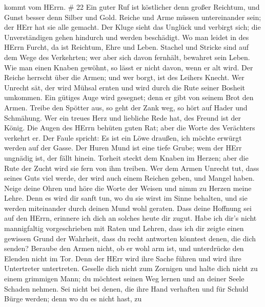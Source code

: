 kommt vom HErrn. \# 22  Ein guter Ruf ist köstlicher denn
großer Reichtum, und Gunst besser denn Silber und Gold. 
Reiche und Arme müssen untereinander sein; der HErr hat sie alle
gemacht.  Der Kluge sieht das Unglück und verbirgt sich; die
Unverständigen gehen hindurch und werden beschädigt.  Wo man
leidet in des HErrn Furcht, da ist Reichtum, Ehre und Leben.
 Stachel und Stricke sind auf dem Wege des Verkehrten; wer
aber sich davon fernhält, bewahret sein Leben.  Wie man
einen Knaben gewöhnt, so lässt er nicht davon, wenn er alt wird.
 Der Reiche herrscht über die Armen; und wer borgt, ist des
Leihers Knecht.  Wer Unrecht sät, der wird Mühsal ernten und
wird durch die Rute seiner Bosheit umkommen.  Ein gütiges
Auge wird gesegnet; denn er gibt von seinem Brot den Armen.
 Treibe den Spötter aus, so geht der Zank weg, so hört auf
Hader und Schmähung.  Wer ein treues Herz und liebliche
Rede hat, des Freund ist der König.  Die Augen des HErrn
behüten guten Rat; aber die Worte des Verächters verkehrt er.
 Der Faule spricht: Es ist ein Löwe draußen, ich möchte
erwürgt werden auf der Gasse.  Der Huren Mund ist eine
tiefe Grube; wem der HErr ungnädig ist, der fällt hinein. 
Torheit steckt dem Knaben im Herzen; aber die Rute der Zucht wird sie
fern von ihm treiben.  Wer dem Armen Unrecht tut, dass
seines Guts viel werde, der wird auch einem Reichen geben, und Mangel
haben.  Neige deine Ohren und höre die Worte der Weisen und
nimm zu Herzen meine Lehre.  Denn es wird dir sanft tun, wo
du sie wirst im Sinne behalten, und sie werden miteinander durch deinen
Mund wohl geraten.  Dass deine Hoffnung sei auf den HErrn,
erinnere ich dich an solches heute dir zugut.  Habe ich
dir's nicht mannigfaltig vorgeschrieben mit Raten und Lehren,
 dass ich dir zeigte einen gewissen Grund der Wahrheit,
dass du recht antworten könntest denen, die dich senden? 
Beraube den Armen nicht, ob er wohl arm ist, und unterdrücke den Elenden
nicht im Tor.  Denn der HErr wird ihre Sache führen und
wird ihre Untertreter untertreten.  Geselle dich nicht zum
Zornigen und halte dich nicht zu einem grimmigen Mann;  du
möchtest seinen Weg lernen und an deiner Seele Schaden nehmen.
 Sei nicht bei denen, die ihre Hand verhaften und für
Schuld Bürge werden;  denn wo du es nicht hast, zu
